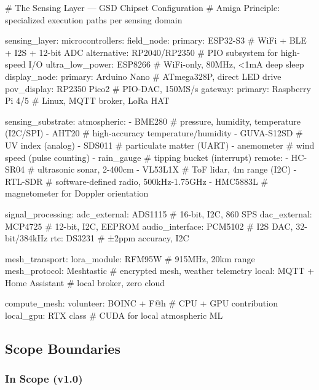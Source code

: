 \documentclass[11pt,letterpaper]{article}
\begin{document}
\begin{asciibox}
# The Sensing Layer --- GSD Chipset Configuration
# Amiga Principle: specialized execution paths per sensing domain

sensing_layer:
  microcontrollers:
    field_node:
      primary: ESP32-S3           # WiFi + BLE + I2S + 12-bit ADC
      alternative: RP2040/RP2350  # PIO subsystem for high-speed I/O
      ultra_low_power: ESP8266    # WiFi-only, 80MHz, <1mA deep sleep
    display_node:
      primary: Arduino Nano       # ATmega328P, direct LED drive
      pov_display: RP2350 Pico2   # PIO-DAC, 150MS/s
    gateway:
      primary: Raspberry Pi 4/5   # Linux, MQTT broker, LoRa HAT

  sensing_substrate:
    atmospheric:
      - BME280    # pressure, humidity, temperature (I2C/SPI)
      - AHT20     # high-accuracy temperature/humidity
      - GUVA-S12SD # UV index (analog)
      - SDS011    # particulate matter (UART)
      - anemometer # wind speed (pulse counting)
      - rain_gauge # tipping bucket (interrupt)
    remote:
      - HC-SR04   # ultrasonic sonar, 2-400cm
      - VL53L1X   # ToF lidar, 4m range (I2C)
      - RTL-SDR   # software-defined radio, 500kHz-1.75GHz
      - HMC5883L  # magnetometer for Doppler orientation

  signal_processing:
    adc_external: ADS1115         # 16-bit, I2C, 860 SPS
    dac_external: MCP4725         # 12-bit, I2C, EEPROM
    audio_interface: PCM5102      # I2S DAC, 32-bit/384kHz
    rtc: DS3231                   # ±2ppm accuracy, I2C

  mesh_transport:
    lora_module: RFM95W           # 915MHz, 20km range
    mesh_protocol: Meshtastic     # encrypted mesh, weather telemetry
    local: MQTT + Home Assistant  # local broker, zero cloud

  compute_mesh:
    volunteer: BOINC + F@h        # CPU + GPU contribution
    local_gpu: RTX class          # CUDA for local atmospheric ML
\end{asciibox}

\subsection{Scope Boundaries}

\subsubsection{In Scope (v1.0)}
\end{document}
